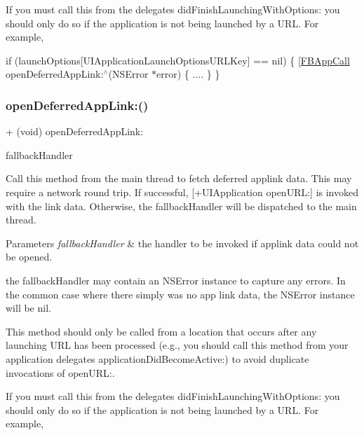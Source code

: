 If you must call this from the delegate\textquotesingle{}s did\+Finish\+Launching\+With\+Options\+: you should only do so if the application is not being launched by a U\+RL. For example,

if (launch\+Options\mbox{[}U\+I\+Application\+Launch\+Options\+U\+R\+L\+Key\mbox{]} == nil) \{ \mbox{[}\hyperlink{interfaceFBAppCall}{F\+B\+App\+Call} open\+Deferred\+App\+Link\+:$^\wedge$(N\+S\+Error $\ast$error) \{ .... \} \} \mbox{\label{interfaceFBAppCall_a02498c71e0be169b1ae49136d1446a23}} 
\subsubsection{\texorpdfstring{open\+Deferred\+App\+Link\+:()}{openDeferredAppLink:()}\hspace{0.1cm}{\footnotesize\ttfamily [4/5]}}
{\footnotesize\ttfamily + (void) open\+Deferred\+App\+Link\+: \begin{DoxyParamCaption}\item[{(F\+B\+App\+Link\+Fallback\+Handler)}]{fallback\+Handler }\end{DoxyParamCaption}}

Call this method from the main thread to fetch deferred applink data. This may require a network round trip. If successful, \mbox{[}+\+U\+I\+Application open\+U\+RL\+:\mbox{]} is invoked with the link data. Otherwise, the fallback\+Handler will be dispatched to the main thread.


\begin{DoxyParams}{Parameters}
{\em fallback\+Handler} & the handler to be invoked if applink data could not be opened.\\
\hline
\end{DoxyParams}
the fallback\+Handler may contain an N\+S\+Error instance to capture any errors. In the common case where there simply was no app link data, the N\+S\+Error instance will be nil.

This method should only be called from a location that occurs after any launching U\+RL has been processed (e.\+g., you should call this method from your application delegate\textquotesingle{}s application\+Did\+Become\+Active\+:) to avoid duplicate invocations of open\+U\+RL\+:.

If you must call this from the delegate\textquotesingle{}s did\+Finish\+Launching\+With\+Options\+: you should only do so if the application is not being launched by a U\+RL. For example,

